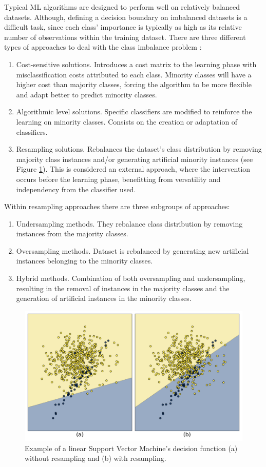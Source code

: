 \documentclass[parskip=full]{scrartcl}
\begin{document}
Typical ML algorithms are designed to perform well on relatively balanced
datasets. Although, defining a decision boundary on imbalanced datasets is a
difficult task, since each class' importance is typically as high as its
relative number of observations within the training dataset. There are three
different types of approaches to deal with the class imbalance problem
\cite{Fernandez2013}:
\begin{enumerate}
	\item Cost-sensitive solutions. Introduces a cost matrix to the learning phase with
	      misclassification costs attributed to each class. Minority classes will have a
	      higher cost than majority classes, forcing the algorithm to be more flexible
	      and adapt better to predict minority classes.
	\item Algorithmic level solutions. Specific classifiers are modified to reinforce the
	      learning on minority classes. Consists on the creation or adaptation of
	      classifiers.
	\item Resampling solutions. Rebalances the dataset's class distribution by removing
	      majority class instances and/or generating artificial minority instances (see
	      Figure \ref{fig:oversampling_decision_function}). This is considered an external  approach, where
	      the intervention occurs before the learning phase, benefitting from versatility
	      and independency from the classifier used.
\end{enumerate}

Within resampling approaches there are three subgroups of approaches:
\begin{enumerate}
	\item Undersampling methods. They rebalance class distribution by removing instances
	      from the majority classes.
	\item Oversampling methods. Dataset is rebalanced by generating new artificial
	      instances belonging to the minority classes.
	\item Hybrid methods. Combination of both oversampling and undersampling, resulting
	      in the removal of instances in the majority classes and the generation of
	      artificial instances in the minority classes.
\end{enumerate}

\begin{figure}[H]
	\centering
	\includegraphics[width=.75\linewidth]{../analysis/oversampling_decision_function}
	\caption{Example of a linear Support Vector Machine's decision function (a) without
		resampling and (b) with resampling.}
	\label{fig:oversampling_decision_function}
\end{figure}
\end{document}
